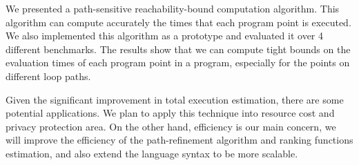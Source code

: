 We presented a path-sensitive reachability-bound computation algorithm.
This algorithm can compute accurately the times that each program point is executed.
We also implemented this algorithm as a prototype and evaluated it over 4 different benchmarks.
The results show that we can compute tight bounds on the evaluation times of each program point in a program, especially for the points on different loop paths.

Given the significant improvement in total execution estimation, there are some potential applications.
We plan to apply this technique into resource cost and privacy protection area.
On the other hand, efficiency is our main concern, we will improve the efficiency of the path-refinement algorithm and ranking functions estimation, and also extend the language syntax
to be more scalable.